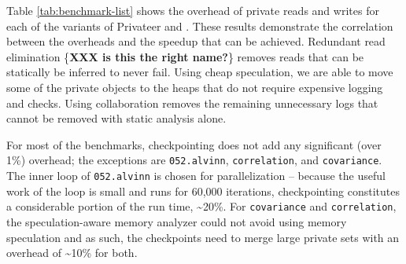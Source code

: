 Table \ref{tab:benchmark-list} shows the overhead of private reads and
writes for each of the variants of Privateer and \namensp. These results
demonstrate the correlation between the overheads and the speedup that can
be achieved. Redundant read elimination \{\textbf{XXX is this the right
name?}\} removes reads that can be statically be inferred to never fail.
Using cheap speculation, we are able to move some of the private objects to
the heaps that do not require expensive logging and checks.
Using collaboration removes the remaining unnecessary logs that cannot
be removed with static analysis alone.

For most of the benchmarks, checkpointing does not add any
significant (over 1\%) overhead; the exceptions are
\texttt{052.alvinn}, \texttt{correlation}, and \texttt{covariance}.
The inner loop of \texttt{052.alvinn} is chosen for parallelization --
because the useful work of the loop is small and runs for 60,000
iterations, checkpointing constitutes a considerable portion of the run
time, \textasciitilde20\%. For \texttt{covariance} and \texttt{correlation},
the speculation-aware memory analyzer could not avoid using memory
speculation and as such, the checkpoints need to merge large private sets
with an overhead of \textasciitilde10\% for both.

